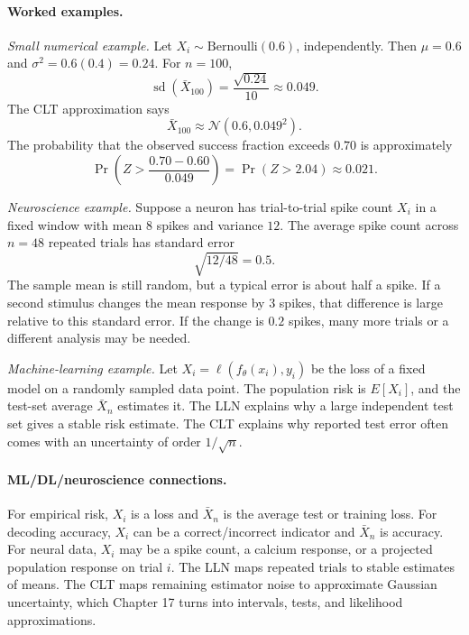 \paragraph{Worked examples.}
\emph{Small numerical example.}
Let \(X_i\sim\mathrm{Bernoulli}(0.6)\), independently. Then \(\mu=0.6\) and \(\sigma^2=0.6(0.4)=0.24\). For \(n=100\),
\[
\operatorname{sd}(\bar X_{100})=\frac{\sqrt{0.24}}{10}\approx0.049.
\]
The CLT approximation says
\[
\bar X_{100}\approx\mathcal N(0.6,0.049^2).
\]
The probability that the observed success fraction exceeds \(0.70\) is approximately
\[
\Pr\!\left(Z>\frac{0.70-0.60}{0.049}\right)
=\Pr(Z>2.04)\approx0.021.
\]

\emph{Neuroscience example.}
Suppose a neuron has trial-to-trial spike count \(X_i\) in a fixed window with mean \(8\) spikes and variance \(12\). The average spike count across \(n=48\) repeated trials has standard error
\[
\sqrt{12/48}=0.5.
\]
The sample mean is still random, but a typical error is about half a spike. If a second stimulus changes the mean response by \(3\) spikes, that difference is large relative to this standard error. If the change is \(0.2\) spikes, many more trials or a different analysis may be needed.

\emph{Machine-learning example.}
Let \(X_i=\ell(f_\theta(x_i),y_i)\) be the loss of a fixed model on a randomly sampled data point. The population risk is \(E[X_i]\), and the test-set average \(\bar X_n\) estimates it. The LLN explains why a large independent test set gives a stable risk estimate. The CLT explains why reported test error often comes with an uncertainty of order \(1/\sqrt n\).

\paragraph{ML/DL/neuroscience connections.}
For empirical risk, \(X_i\) is a loss and \(\bar X_n\) is the average test or training loss. For decoding accuracy, \(X_i\) can be a correct/incorrect indicator and \(\bar X_n\) is accuracy. For neural data, \(X_i\) may be a spike count, a calcium response, or a projected population response on trial \(i\). The LLN maps repeated trials to stable estimates of means. The CLT maps remaining estimator noise to approximate Gaussian uncertainty, which Chapter 17 turns into intervals, tests, and likelihood approximations.

